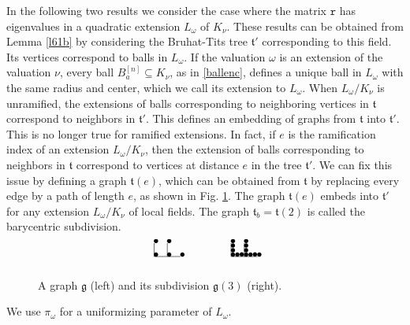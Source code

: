 \documentclass{article}
\theoremstyle{definition}
\theoremstyle{remark}
\begin{document}
In the following two results we consider the case where
the matrix $\mathtt{r}$ has eigenvalues in a quadratic
extension $L_\omega$ of $K_\nu$. These results can be 
obtained from Lemma \ref{l61b} by considering the
Bruhat-Tits tree $\mathfrak{t}'$ corresponding
to this field. Its vertices correspond to balls
in $L_\omega$. If the valuation $\omega$ is an 
extension of the valuation $\nu$, every ball
$B_a^{[n]}\subseteq K_\nu$, as in \ref{ballenc}, 
defines a unique
ball in $L_\omega$ with the same radius and center,
which we call its extension to $L_\omega$.
When $L_\omega/K_\nu$ is unramified, the extensions
of balls corresponding to neighboring vertices
in $\mathfrak{t}$ correspond to neighbors
in $\mathfrak{t}'$. This defines
an embedding of graphs from $\mathfrak{t}$ into 
$\mathfrak{t}'$. This is no longer true for ramified
extensions. In fact, if $e$ is the ramification index
of an extension $L_\omega/K_\nu$, then the extension
of balls corresponding to neighbors in $\mathfrak{t}$
correspond to vertices at distance $e$ in the tree
$\mathfrak{t}'$. We can fix
this issue by defining a graph $\mathfrak{t}(e)$,
which can be obtained from $\mathfrak{t}$ by replacing
every edge by a path of length $e$, as shown in 
Fig. \ref{fnew1}. The graph $\mathfrak{t}(e)$ embeds
into $\mathfrak{t}'$ for any extension $L_\omega/K_\nu$
of local fields. The graph $\mathfrak{t}_b=\mathfrak{t}(2)$
is called the barycentric subdivision. 
\begin{figure}
    \unitlength 1mm %
\linethickness{0.4pt}
\ifx\plotpoint\undefined\newsavebox{\plotpoint}\fi 
    \[
    \begin{picture}(30,14)(0,40)
\put(15.2,43.2){$\bullet$}
\put(15.2,55.4){$\bullet$}
\put(16,44){\line(0,1){12}}
\put(3.2,43.2){$\bullet$}
\put(3.2,55.4){$\bullet$}
\put(4,44){\line(0,1){12}}
\put(4,44){\line(1,0){24}}
\put(27.2,43.2){$\bullet$}
\end{picture}\qquad\qquad 
\begin{picture}(30,14)(0,40)
\put(15.2,43.2){$\bullet$}
\put(15.2,55.4){$\bullet$}
\put(16,44){\line(0,1){12}}
\put(15.2,47.2){$\bullet$}
\put(15.2,51.4){$\bullet$}
\put(3.2,43.2){$\bullet$}
\put(3.2,55.4){$\bullet$}
\put(4,44){\line(0,1){12}}
\put(3.2,47.2){$\bullet$}
\put(3.2,51.4){$\bullet$}
\put(4,44){\line(1,0){24}}
\put(7.2,43.2){$\bullet$}
\put(11.2,43.4){$\bullet$}
\put(19.2,43.2){$\bullet$}
\put(23.2,43.4){$\bullet$}
\put(27.2,43.2){$\bullet$}
\end{picture}
\]
    \caption{A graph $\mathfrak{g}$ (left) and its 
    subdivision $\mathfrak{g}(3)$ (right).}
    \label{fnew1}
\end{figure}
We use $\pi_\omega$
for a uniformizing parameter of $L_\omega$.
\end{document}
